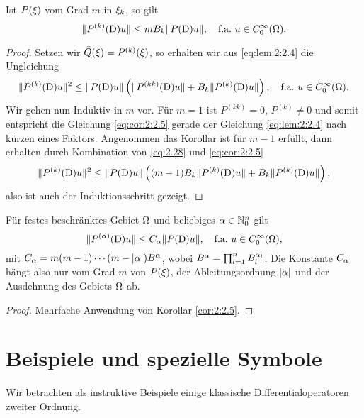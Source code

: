 \begin{cor}\label{cor:2:2.5}
Ist $P(\xi)$ vom Grad $m$ in $\xi_k$, so gilt
\begin{equation}\label{eq:cor:2:2.5}
\lVert P^{(k)}(\mathrm D)u\rVert\leq mB_k\lVert P(\mathrm D)u\rVert,
\quad\text{f.a.}~u\in C^\infty_0(\Omega).
\end{equation}
\end{cor}
\begin{proof}
Setzen wir $\bar{Q}(\xi)=P^{(k)}(\xi)$, so erhalten wir aus \eqref{eq:lem:2:2.4} die Ungleichung
\begin{equation}\label{eq:2.28}
\lVert P^{(k)}(\mathrm D)u\rVert^2\leq\lVert P(\mathrm D)u\rVert\left(\lVert P^{(kk)}(\mathrm D)u\rVert+B_k\lVert P^{(k)}(\mathrm D)u\rVert\right),
\quad\text{f.a.}~u\in C^\infty_0(\Omega).
\end{equation}
Wir gehen nun Induktiv in $m$ vor.
Für $m=1$ ist $P^{(kk)}=0$, $P^{(k)}\neq0$ und somit entspricht die Gleichung \eqref{eq:cor:2:2.5}
gerade der Gleichung \eqref{eq:lem:2:2.4} nach kürzen eines Faktors.
Angenommen das Korollar ist für $m-1$ erfüllt,
dann erhalten durch Kombination von \eqref{eq:2.28} und \eqref{eq:cor:2:2.5}
\begin{equation}
\lVert P^{(k)}(\mathrm D)u\rVert^2\leq\lVert P(\mathrm D)u\rVert\left((m-1)B_k\lVert P^{(k)}(\mathrm D)u\rVert+B_k\lVert P^{(k)}(\mathrm D)u\rVert\right),
\end{equation}
also ist auch der Induktionsschritt gezeigt.
\end{proof}

\begin{cor}\label{cor:2:2.6}
Für festes beschränktes Gebiet $\Omega$ und beliebiges $\alpha\in\mathbb N^n_0$ gilt
\begin{equation}
\lVert P^{(\alpha)}(\mathrm D)u\rVert\leq C_\alpha\lVert P(\mathrm D)u\rVert,
\quad\text{f.a.}~u\in C^\infty_0(\Omega),
\end{equation}
mit $C_\alpha=m(m-1)\cdots(m-\lvert\alpha\rvert)B^\alpha$, wobei $B^\alpha=\prod_{l=1}^n B^{\alpha_l}_l$.
Die Konstante $C_\alpha$ hängt also nur vom Grad $m$ von $P(\xi)$,
der Ableitungsordnung $\lvert\alpha\rvert$ und der Ausdehnung des Gebiets $\Omega$ ab.
\end{cor}

\begin{proof}
Mehrfache Anwendung von Korollar \ref{cor:2:2.5}.
\end{proof}

\section{Beispiele und spezielle Symbole}

Wir betrachten als instruktive Beispiele
einige klassische Differentialoperatoren zweiter Ordnung.

